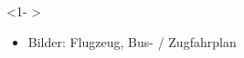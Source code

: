 
\begin{frame}
	
	\begin{block} <1- >
		\begin{itemize}
			\item <1- > Bilder: Flugzeug, Bus- / Zugfahrplan
		\end{itemize}
		
	\end{block}
\end{frame}


